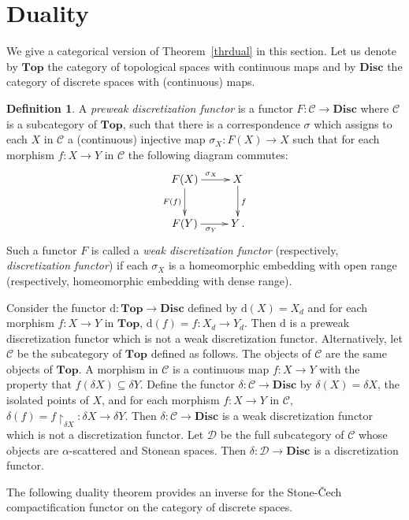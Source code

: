 \documentclass[manuscript]{amsart}
\theoremstyle{definition}
\newtheorem{definition}{Definition}[section]
\begin{document}
\section{Duality}
\noindent
We  give a categorical version of Theorem~\ref{thrdual} in this section.
Let us denote by $\mathbf{Top}$ the category of topological spaces
with continuous maps and by $\mathbf{Disc}$ the category of discrete spaces
with (continuous) maps.
\begin{definition}\label{defdiscfu}
A \emph{preweak discretization functor} is a functor
$F: \mathcal{C}\to  \mathbf{Disc}$ where
$\mathcal{C}$ is a subcategory of  $\mathbf{Top}$, such that
there is a correspondence $\sigma$ which assigns to each $X$ in $\mathcal{C}$
 a (continuous) injective map  $\sigma_{X}: F(X)\to X$ such that for each morphism
$f:X\to Y$ in $\mathcal{C}$
the following diagram commutes:
\[
\xymatrix{
F(X) \ar[d]_{F(f)}\ar[r]^{\sigma_{X}} & X \ar[d]^{f} \\
F(Y)\ar[r]_{\sigma_{Y}}  & Y\, .
}
\]
Such a functor $F$ is called a \emph{weak discretization functor} (respectively, \textit{discretization functor})
if each $\sigma_{X}$ is a homeomorphic embedding with open range (respectively, homeomorphic embedding
with dense range).
\end{definition}

Consider the functor $\mathrm{d}: \mathbf{Top}\to \mathbf{Disc}$ defined
by $\mathrm{d}(X)=X_{d}$ and for each morphism
$f:X\to Y$ in $ \mathbf{Top}$, $\mathrm{d}(f)=f: X_{d}\to Y_{d}$.
Then $\mathrm{d}$ is a preweak discretization functor which is not a
weak discretization functor. Alternatively, let $\mathcal{C}$ be the subcategory of $\mathbf{Top}$  defined as follows.
The objects of $\mathcal{C}$ are the same objects of $\mathbf{Top}$.
A morphism in $\mathcal{C}$ is a continuous map
$f:X\to Y$ with the property that $f(\delta X)\subseteq \delta Y$.
Define the functor $\delta :\mathcal{C}\to  \mathbf{Disc}$ by
$\delta(X)=\delta X$, the isolated points of $X$, and
for each morphism $f:X\to Y$ in $\mathcal{C}$,
$\delta(f)=f\upharpoonright_{\delta X}: \delta X\to \delta Y$.
Then $\delta :\mathcal{C}\to  \mathbf{Disc}$ is a
weak discretization functor which is not a
 discretization functor.
Let $\mathcal{D}$ be the full subcategory of $\mathcal{C}$ whose objects
are  $\alpha$-scattered and Stonean spaces.
Then $\delta :\mathcal{D}\to  \mathbf{Disc}$ is a
discretization functor.

The following duality theorem provides an inverse for the Stone-\v{C}ech compactification functor
on the category of discrete spaces.
\end{document}
